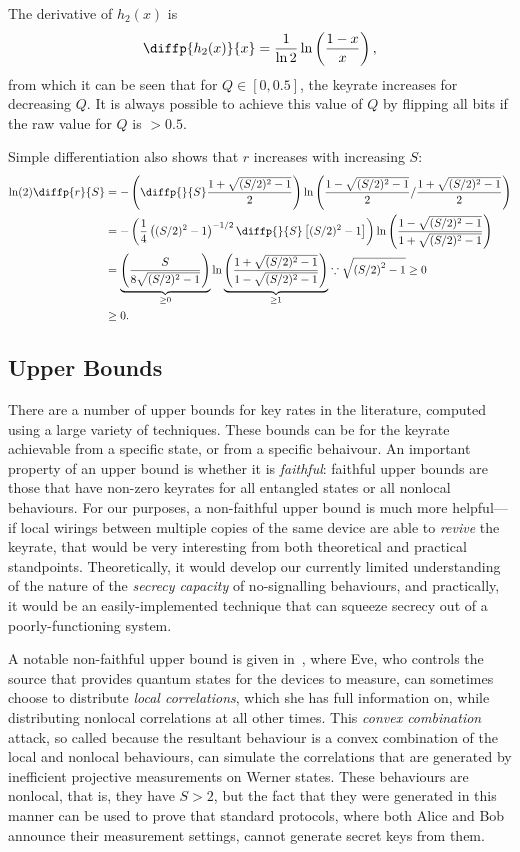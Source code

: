 \documentclass[10pt, a4paper]{article}
\newcommand{\?}{\mathrel{?}} %
\numberwithin{equation}{section} %
\theoremstyle{definition}
\theoremstyle{plain}
\theoremstyle{plain}
\begin{document}
  The derivative of \(h_2(x)\) is
  \[ \diffp{{h_2(x)}}{x} = \frac{1}{\ln 2} \ln \left(\frac{1-x}{x}\right), \]
  from which it can be seen that for \(Q \in [0, 0.5]\), the keyrate increases for decreasing \(Q\). It is always possible to achieve this value of \(Q\) by flipping all bits if the raw value for \(Q\) is \(> 0.5\).

  Simple differentiation also shows that \(r\) increases with increasing \(S\):
  \begin{align*}
    \ln (2) \diffp{r}{S} &= - \left( \diffp{}{S} \frac{1 + \sqrt{(S/2)^2-1}}{2} \right) \ln \left( \frac{1 - \sqrt{(S/2)^2-1}}{2} / \frac{1 + \sqrt{(S/2)^2-1}}{2} \right) \\
                 &= - \left( \frac{1}{4} \left( (S/2)^2-1 \right)^{-1/2} \diffp{}{S} \left[ (S/2)^2-1 \right] \right) \ln \left( \frac{1 - \sqrt{(S/2)^2-1}}{1 + \sqrt{(S/2)^2-1}} \right) \\
                 &= \underbrace{\left( \frac{S}{ 8\sqrt{(S/2)^2-1} } \right)}_{\geq 0} \ln \underbrace{ \left( \frac{1 + \sqrt{(S/2)^2-1}}{1 - \sqrt{(S/2)^2-1}} \right) }_{\geq 1} \because \sqrt{{(S/2)}^2-1} \geq 0 \\
                 &\geq 0.
  \end{align*}

  \subsection{Upper Bounds}

  There are a number of upper bounds for key rates in the literature, computed using a large variety of techniques. These bounds can be for the keyrate achievable from a specific state, or from a specific behaivour. An important property of an upper bound is whether it is \emph{faithful}: faithful upper bounds are those that have non-zero keyrates for all entangled states or all nonlocal behaviours. For our purposes, a non-faithful upper bound is much more helpful---if local wirings between multiple copies of the same device are able to \emph{revive} the keyrate, that would be very interesting from both theoretical and practical standpoints. Theoretically, it would develop our currently limited understanding of the nature of the \emph{secrecy capacity} of no-signalling behaviours, and practically, it would be an easily-implemented technique that can squeeze secrecy out of a poorly-functioning system.

  A notable non-faithful upper bound is given in~\cite{NotSufficient}, where Eve, who controls the source that provides quantum states for the devices to measure, can sometimes choose to distribute \emph{local correlations}, which she has full information on, while distributing nonlocal correlations at all other times. This \emph{convex combination} attack, so called because the resultant behaviour is a convex combination of the local and nonlocal behaviours, can simulate the correlations that are generated by inefficient projective measurements on Werner states. These behaviours are nonlocal, that is, they have \(S > 2\), but the fact that they were generated in this manner can be used to prove that standard protocols, where both Alice and Bob announce their measurement settings, cannot generate secret keys from them.
\end{document}
